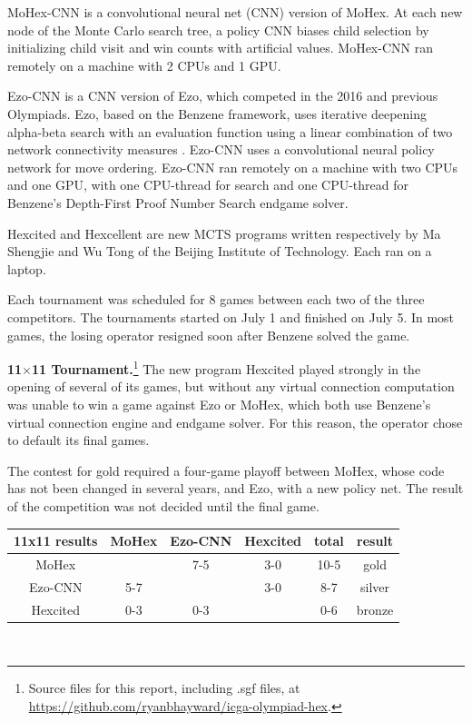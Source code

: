 \documentclass{icga}
\def\Eo{\mbox{\sc Ezo}}
\def\Ec{\mbox{\sc Ezo-CNN}}
\def\Hite{\mbox{\sc Hexcited}}
\def\Hent{\mbox{\sc Hexcellent}}
\def\Mx{\mbox{\sc MoHex}}
\def\Mc{\mbox{\sc MoHex-CNN}}
\begin{document}
\Mc{} is a convolutional neural net (CNN) version of \Mx{}. 
At each new node of the Monte Carlo search tree, 
a policy CNN biases child selection by
initializing child visit and win counts with artificial values.
\Mc{} ran remotely on a machine with 2 CPUs and 1 GPU.

\Ec{} is a CNN version of \Eo{}, which competed
in the 2016 and previous Olympiads.
\Eo{}, based on the Benzene framework, 
uses iterative deepening alpha-beta search 
with an evaluation function using a linear combination of
two network connectivity measures .
\Ec{} uses a convolutional neural policy network
for move ordering.
\Ec{} ran remotely on a machine
with two CPUs and one GPU,
with one CPU-thread for search and one CPU-thread for
Benzene's Depth-First Proof Number Search endgame solver.

\Hite{} and \Hent{} are new MCTS programs written 
respectively by Ma Shengjie and Wu Tong
of the Beijing Institute of Technology.
Each ran on a laptop.

Each tournament was scheduled for 8 games between
each two of the three competitors.
The tournaments started on July 1 and finished on July 5.
In most games, the losing operator resigned
soon after Benzene solved the game.

{\large\bf 11$\times$11 Tournament.}\footnote{Source files for this report, including .sgf files, at \url{https://github.com/ryanbhayward/icga-olympiad-hex}.}
The new program \Hite{} played strongly in the opening of
several of its games,
but without any virtual connection computation was unable
to win a game against \Eo{} or \Mx{}, which both
use Benzene's virtual connection engine and endgame solver.
For this reason, the operator chose to default its final games.

The contest for gold required a four-game playoff between
\Mx{}, whose code has not been changed in several years,
and \Eo{}, with a new policy net.
The result of the competition was not decided until the final game.

\hfill\begin{tabular}{|c|c|c|c|c|c|}
\hline 11x11 results &\Mx{} &\Ec{}  & \Hite{}  & total & result \\ 
\hline \Mx{}         &      &  7-5  &  3-0   & 10-5  &  gold \\
\hline \Ec{}         &  5-7 &       &  3-0   & 8-7   &  silver \\
\hline \Hite{}       &  0-3 &  0-3  &        & 0-6   &  bronze \\
\hline
\end{tabular}\hfill~
\end{document}
